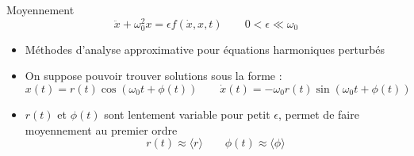 \begin{frame}{Moyennement}
    $$ \ddot{x} + \omega_0^2 x = \epsilon f(\dot{x}, x, t) \qquad 0 < \epsilon \ll \omega_0 $$
    \begin{itemize}
        \item Méthodes d'analyse approximative pour équations harmoniques perturbés
        \item On suppose pouvoir trouver solutions sous la forme \cite{rand_lecture_2012} :
            $$x(t) = r(t)\cos(\omega_0 t + \phi(t)) \qquad \dot{x}(t) =  -\omega_0 r(t)\sin(\omega_0 t + \phi(t))$$
        \item $r(t)$ et $\phi(t)$ sont lentement variable pour petit $\epsilon$, permet de faire moyennement au premier ordre
            $$ r(t) \approx \langle r \rangle \qquad \phi(t) \approx \langle \phi \rangle $$
    \end{itemize}
\end{frame}

